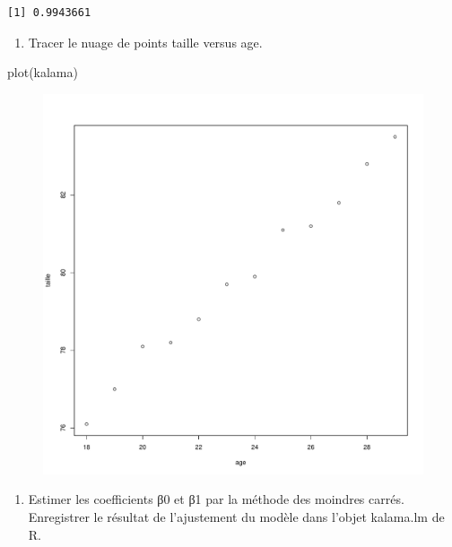 \documentclass[
  letterpaper,
  DIV=11,
  numbers=noendperiod]{scrartcl}
\newenvironment{Shaded}{}{}
\newcommand{\FunctionTok}[1]{\textcolor[rgb]{0.44,0.26,0.76}{#1}}
\newcommand{\NormalTok}[1]{\textcolor[rgb]{0.14,0.16,0.18}{#1}}
\providecommand{\tightlist}{%
  \setlength{\itemsep}{0pt}\setlength{\parskip}{0pt}}\usepackage{longtable,booktabs,array}
\begin{document}
\begin{verbatim}
[1] 0.9943661
\end{verbatim}

\begin{enumerate}
\def\labelenumi{\alph{enumi})}
\setcounter{enumi}{1}
\tightlist
\item
  Tracer le nuage de points taille versus age.
\end{enumerate}

\begin{Shaded}
\begin{Highlighting}[]
\FunctionTok{plot}\NormalTok{(kalama)}
\end{Highlighting}
\end{Shaded}

\begin{figure}[H]

{\centering \includegraphics{pw_2_files/figure-pdf/unnamed-chunk-3-1.pdf}

}

\end{figure}

\begin{enumerate}
\def\labelenumi{\alph{enumi})}
\setcounter{enumi}{2}
\tightlist
\item
  Estimer les coefficients β0 et β1 par la méthode des moindres carrés.
  Enregistrer le résultat de l'ajustement du modèle dans l'objet
  kalama.lm de R.
\end{enumerate}
\end{document}
